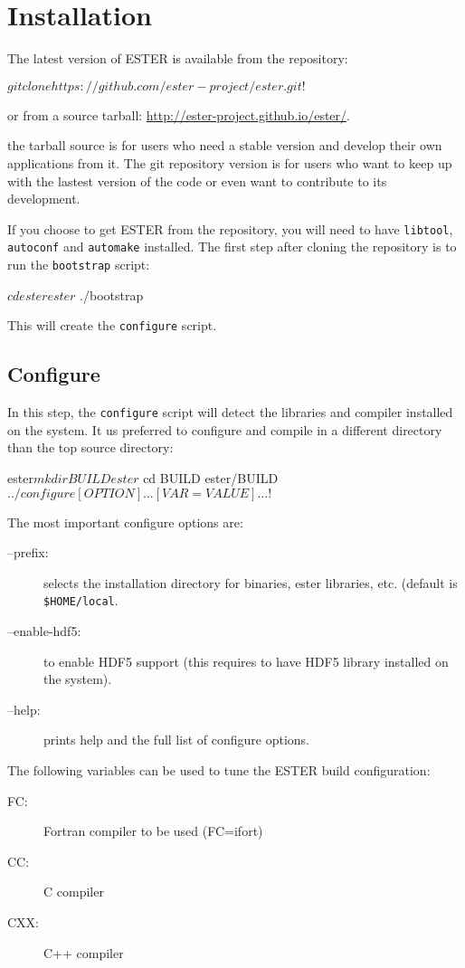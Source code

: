 \pagebreak

\section{Installation}

The latest version of ESTER is available from the \git repository:
\begin{shell}
    $ git clone https://github.com/ester-project/ester.git
    !$
\end{shell}
or from a source tarball: \url{http://ester-project.github.io/ester/}.

the tarball source is for users who need a stable version and develop
their own applications from it. The git repository version is for users
who want to keep up with the lastest version of the code or even want to
contribute to its development.

If you choose to get ESTER from the \git repository, you will need to have
\texttt{libtool}, \texttt{autoconf} and \texttt{automake} installed.
The first step after cloning the repository is to run the \texttt{bootstrap}
script:
\begin{shell}
    $ cd ester
    ester$ ./bootstrap
\end{shell}
This will create the \texttt{configure} script.

\subsection{Configure}
In this step, the \texttt{configure} script will detect the libraries and
compiler installed on the system.
It us preferred to configure and compile in a different directory than the top
source directory:
\begin{shell}
    ester$ mkdir BUILD
    ester$ cd BUILD
    ester/BUILD$ ../configure [OPTION]... [VAR=VALUE]...
    !$
\end{shell}

The most important configure options are:
\begin{description}
    \item[--prefix:] selects the installation directory for binaries,
ester libraries, etc. (default is \texttt{\$HOME/local}.
    \item[--enable-hdf5:] to enable HDF5 support (this requires to have HDF5
        library installed on the system).
    \item[--help:] prints help and the full list of configure options.
\end{description}
The following variables can be used to tune the ESTER build configuration:
\begin{description}
    \item[FC:] Fortran compiler to be used (\eg FC=ifort)
    \item[CC:] C compiler
    \item[CXX:] C++ compiler
\end{description}


